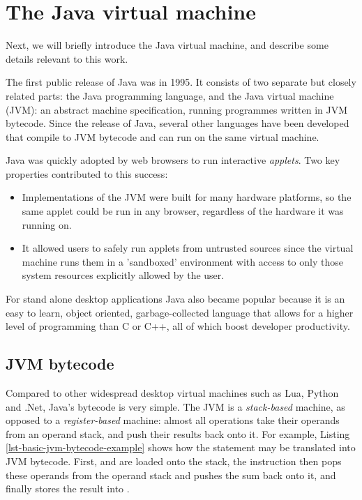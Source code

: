 \section{The Java virtual machine}
Next, we will briefly introduce the Java virtual machine, and describe some details relevant to this work.

The first public release of Java was in 1995. It consists of two separate but closely related parts: the Java programming language, and the Java virtual machine (JVM): an abstract machine specification, running programmes written in JVM bytecode. Since the release of Java, several other languages have been developed that compile to JVM bytecode and can run on the same virtual machine.

Java was quickly adopted by web browsers to run interactive \emph{applets}. Two key properties contributed to this success:
\begin{itemize}
    \item Implementations of the JVM were built for many hardware platforms, so the same applet could be run in any browser, regardless of the hardware it was running on.
    \item It allowed users to safely run applets from untrusted sources since the virtual machine runs them in a 'sandboxed' environment with access to only those system resources explicitly allowed by the user.
\end{itemize}

For stand alone desktop applications Java also became popular because it is an easy to learn, object oriented, garbage-collected language that allows for a higher level of programming than C or C++, all of which boost developer productivity.

\subsection{JVM bytecode}
Compared to other widespread desktop virtual machines such as Lua, Python and .Net, Java's bytecode is very simple. The JVM is a \emph{stack-based} machine, as opposed to a \emph{register-based} machine: almost all operations take their operands from an operand stack, and push their results back onto it. For example, Listing \ref{lst-basic-jvm-bytecode-example} shows how the statement  may be translated into JVM bytecode. First,  and  are loaded onto the stack, the  instruction then pops these operands from the operand stack and pushes the sum back onto it, and finally  stores the result into .

